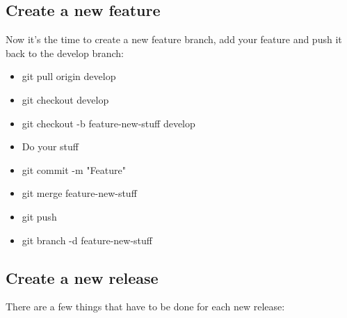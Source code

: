 \documentclass{article}
\begin{document}
\subsection{Create a new feature}
Now it's the time to create a new feature branch, add your feature and push it back to the develop branch:

\begin{itemize}
	\item git pull origin develop
	\item git checkout develop
	\item git checkout -b feature-new-stuff develop
	\item Do your stuff
	\item git commit -m "Feature"
	\item git merge feature-new-stuff
	\item git push
	\item git branch -d feature-new-stuff
\end{itemize}

\subsection{Create a new release}
There are a few things that have to be done for each new release:
\end{document}

